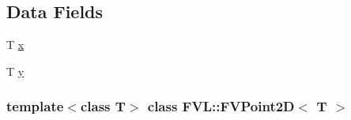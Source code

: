 \subsection*{Data Fields}
\begin{DoxyCompactItemize}
\item 
T \hyperlink{classFVL_1_1FVPoint2D_a9a4f74af87a76a4c3dcb729cb0e68f8d}{x}
\item 
T \hyperlink{classFVL_1_1FVPoint2D_a1cb2b5ea04251d543e49356ef54eb853}{y}
\end{DoxyCompactItemize}
\subsubsection*{template$<$class T$>$ class FVL::FVPoint2D$<$ T $>$}



